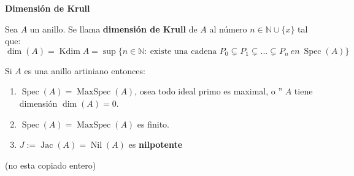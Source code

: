 \documentclass[openany]{book}
\begin{document}
\begin{definition}
    \textbf{Dimensión de Krull}

    Sea $ A  $ un anillo. Se llama \textbf{dimensión de Krull} de $ A $ al número $ n \in \mathbb{N} \cup \{x\}$ tal que:
    $$ \operatorname{dim}(A) = \operatorname{Kdim}A = \sup \{n \in \mathbb{N}:\ \text{existe una cadena } P_0 \subsetneq P_1 \subsetneq ... \subsetneq P_n\ en\ \operatorname{Spec}(A)\}$$
\end{definition}

\begin{proposition}
    Si $ A $ es una anillo artiniano entonces:
    \begin{enumerate}
        \item $ \operatorname{Spec}(A) = \operatorname{MaxSpec}(A) $, osea todo ideal primo es maximal, o '' $ A $ tiene dimensión $ \operatorname{dim}(A) = 0 $.
        \item $ \operatorname{Spec}(A) = \operatorname{MaxSpec}(A) $ es finito.
        \item $ J:= \operatorname{Jac}(A) = \operatorname{Nil}(A) $ es \textbf{nilpotente}
    \end{enumerate}
    (no esta copiado entero)
\end{proposition}
\end{document}
